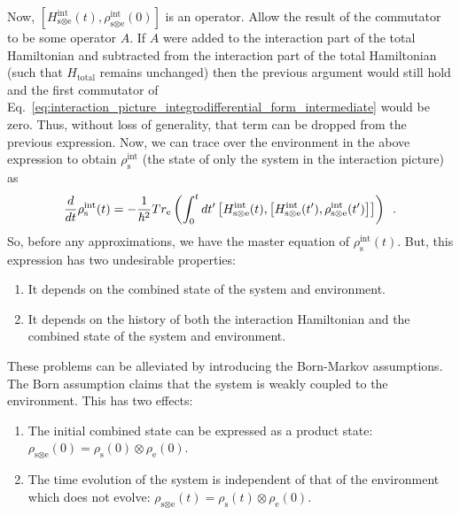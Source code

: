 \documentclass{article}
\begin{document}
Now, $ \left[ H_{\textrm{s} \otimes \textrm{e}}^{\textrm{int}}(t), \rho_{\textrm{s} \otimes \textrm{e}}^{\textrm{int}}(0) \right] $ is an
operator. Allow the result of the commutator to be some operator $ A $. If $ A $
were added to the interaction part of the total Hamiltonian and subtracted from
the interaction part of the total Hamiltonian (such that $ H_{\textrm{total}} $
remains unchanged) then the previous argument would still hold and the first
commutator of
Eq.~\ref{eq:interaction_picture_integrodifferential_form_intermediate} would be
zero. Thus, without loss of generality, that term can be dropped from the previous
expression. Now, we can trace over the environment in the above expression to
obtain $ \rho^{\textrm{int}}_{\textrm{s}} $ (the state of only the system in the
interaction picture) as
\begin{equation}
   \frac{d}{dt} \rho^{\textrm{int}}_{\textrm{s}}(t) =
    - \frac{1}{\hbar^{2}}
    Tr_{\textrm{e}} \left( \int_{0}^{t} dt' \left[ H_{\textrm{s} \otimes \textrm{e}}^{\textrm{int}}(t) ,
          \left[ H_{\textrm{s} \otimes \textrm{e}}^{\textrm{int}}(t') ,
       \rho_{\textrm{s} \otimes \textrm{e}}^{\textrm{int}}(t') \right] \right]
       \right) \enskip.
   \label{eq:interaction_picture_integrodifferential_form_final}
\end{equation}
So, before any approximations, we have the master equation of $
\rho_{\textrm{s}}^{\textrm{int}}(t) $. But, this expression has two undesirable properties:
\begin{enumerate}
   \item It depends on the combined state of the system and environment.
   \item It depends on the history of both the interaction Hamiltonian and the
      combined state of the system and environment.
\end{enumerate}
These problems can be alleviated by introducing the Born-Markov assumptions. The
Born assumption claims that the system is weakly coupled to the
environment. This has two effects:
\begin{enumerate}
   \item The initial combined state can be expressed as a product state: $
      \rho_{\textrm{s} \otimes \textrm{e}}(0) = \rho_{\textrm{s}}(0) \otimes
      \rho_{\textrm{e}}(0) $.
   \item The time evolution of the system is independent of that of the
      environment which does not evolve: $ \rho _{\textrm{s} \otimes
      \textrm{e}}(t)
      = \rho_{\textrm{s}}(t) \otimes \rho_{\textrm{e}}(0) $.
\end{enumerate}
\end{document}
